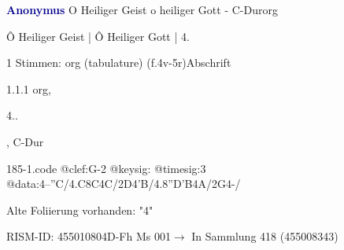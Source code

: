 \documentclass[twocolumn, 12pt]{book}
\begin{document}
\par \vspace{16pt} \textcolor{darkblue}{\textbf{Anonymus  }}\hfillplus{\textbf{[185]}}\newline O Heiliger Geist o heiliger Gott - C-Dur\newline org
\par \begin{itshape}[f.4v, at left:] Ô Heiliger Geist | Ô Heiliger Gott | 4.\end{itshape} 
\par \textcolor{darkblue}{}  1 Stimmen: org (tabulature)  (f.4v-5r)\newline Abschrift
\par 1.1.1  org, \begin{itshape}4..\end{itshape}, C-Dur  
\begin{filecontents*}{185-1.code}
@clef:G-2
@keysig:
@timesig:3
@data:4--''C/4.C8C4C/2D4'B/4.8''D'B4A/2G4-/
\end{filecontents*}
\newline %
\par Alte Foliierung vorhanden: "4"
\par RISM-ID: 455010804\newline D-Fh  Ms 001\newline $\rightarrow$ In Sammlung 418 (455008343)
      
\end{document}
